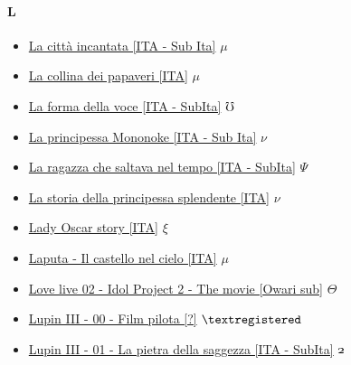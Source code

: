 		
			
		\paragraph{L} \hypertarget{FL}{}
			\begin{itemize}
				
				\item \href{https://mega.nz/#!QpAkgZhb!FL0QJ1BuUnj50ZruLtJ--I8i_0-3KymlC59WUl-Dz1E} {La città incantata [ITA - Sub Ita]} $\mu$   \\  
				\item \href{https://mega.nz/#!JxxyVIbb!RGmIMaowexazv51Vz17FNpyp97p0kMsR_8Fr-LeX7MY} {La collina dei papaveri [ITA]} $\mu$   \\ 	
				\item \href{https://mega.nz/#!j6Y1iAzB!Sn7jzdgKaD7Esw5hkXAcMo4MQIfyTrmloCjy30KtE0w} {La forma della voce [ITA - SubIta]} $\mho$   \\ 	
				\item \href{https://mega.nz/#!vxM1HTQb!YbIN2xUntl1j8y91TgJEfH79aPvQ6vrpNgiTYhg0yYQ} {La principessa Mononoke [ITA - Sub Ita]} $\nu$   \\ 
				\item \href{https://mega.nz/#!MP4zBSQC!IcL1SCu94mU-P-3zWUd5nco7TtVD_HEiM1mfQ9tmjTE} {La ragazza che saltava nel tempo [ITA - SubIta]} $\Psi$   \\ 
				\item \href{https://mega.nz/#!K08xUJSC!h8gYC1W_qk4C72e9NWTfo7Ir3jnuRiPEdykbg_Qc9c8} {La storia della principessa splendente [ITA]} $\nu$   \\ 	
				\item \href{https://mega.nz/#!XoZVkZTJ!894tMeYUe69VbpDZkgP4JiLU7n8kjp4NJAy4FdKjNUk} {Lady Oscar story [ITA]} $\xi$   \\ 	 
				\item \href{https://mega.nz/#!k4wylYrI!X56fK59g0J1dc8l_eafr1DE3HREPRhI6_OBwB4H8XOg} {Laputa - Il castello nel cielo [ITA]} $\mu$   \\ 
				\item \href{https://mega.nz/#!FLhiUDJC!lWJ3Xmxw_raxagB8GJwsArji16ltW8Zn6sE2x7qQ6fM} {Love live 02 - Idol Project 2 - The movie [Owari sub]} $\varTheta$   \\ 		
				\item \href{https://mega.nz/#!auhHGbTR!-mjvlSI92-XW8Qbcyz2-mOte1DPBFwKxf8wzb6gjQ48} {Lupin III - 00 - Film pilota [?]} $\textregistered$   \\  
				\item \href{https://mega.nz/#!HCgFjaST!MMXocBYMvBN8XNy6ehpswFn-5ikcMkX9Hh2rTKyfJSk} {Lupin III - 01 - La pietra della saggezza [ITA - SubIta]} $\oldstylenums{2}$   \\  

\end{itemize}
